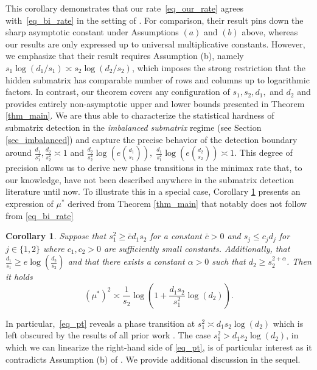 \documentclass{article}
\newtheorem{corollary}{Corollary}
\theoremstyle{remark}
\begin{document}
    This corollary demonstrates that our rate~\eqref{eq_our_rate} agrees with~\eqref{eq_bi_rate} in the setting of \cite{butucea2013detection}. 
    For comparison, their result pins down the sharp asymptotic constant under Assumptions $(a)$ and $(b)$ above, whereas our results are only expressed up to universal multiplicative constants. 
    However, we emphasize that their result requires Assumption (b), namely $s_1 \log(d_1/s_1) \asymp s_2 \log(d_2/s_2)$, which imposes the strong restriction that the hidden submatrix has comparable number of rows and columns up to logarithmic factors. 
    In contrast, our theorem covers any configuration of $s_1, s_2, d_1,$ and $d_2$ and provides entirely non-asymptotic upper and lower bounds presented in Theorem \ref{thm_main}. We are thus able to characterize the statistical hardness of submatrix detection in the \textit{imbalanced submatrix} regime (see Section \ref{sec_imbalanced}) and capture the precise behavior of the detection boundary around $\frac{d_1}{s_1^2}, \frac{d_2}{s_2^2} \asymp 1$ and $\frac{d_2}{s_2^2} \log(e{d_1 \choose s_1}), \; \frac{d_1}{s_1^2} \log(e{d_2 \choose s_2}) \asymp 1$. This degree of precision allows us to derive new phase transitions in the minimax rate that, to our knowledge, have not been described anywhere in the submatrix detection literature until now. To illustrate this in a special case, Corollary \ref{cor_pt} presents an expression of $\mu^*$ derived from Theorem \ref{thm_main} that notably does not follow from \eqref{eq_bi_rate}
    \begin{corollary}\label{cor_pt}
        Suppose that $s_1^2 \geq \bar{c}d_1 s_2$ for a constant $\bar{c} > 0$ and $s_j \leq c_j d_j$ for $j \in \{1, 2\}$ where $c_1,c_2 > 0$ are sufficiently small constants. Additionally, that $\frac{d_1}{s_1} \geq e \log(\frac{d_2}{s_2})$ and that there exists a constant $\alpha > 0$ such that $d_2 \geq s_2^{2 + \alpha}$. Then it holds
\begin{equation}\label{eq_pt}
    (\mu^*)^2 \asymp \frac{1}{s_2}\log\left(1 + \frac{d_1s_2}{s_1^2}\log(d_2)\right).
\end{equation}
    \end{corollary}
    In particular,~\eqref{eq_pt} reveals a phase transition at $s_1^2 \asymp d_1s_2\log(d_2)$ which is left obscured by the results of all prior work \citep{butucea2013detection, ma2015computational, luo2022tensor, dadon2024detection}. The case $s_1^2 > d_1s_2\log(d_2)$, in which we can linearize the right-hand side of \eqref{eq_pt}, is of particular interest as it contradicts Assumption (b) of \citet{butucea2013detection}. We provide additional discussion in the sequel.
\end{document}
